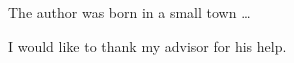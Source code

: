 \begin{biography}
The author was born in a small town \ldots
\end{biography}

\begin{acknowledgements}
I would like to thank my advisor for his help.
\end{acknowledgements}


\thesistableofcontents

\thesislistoftables

\thesislistoffigures
